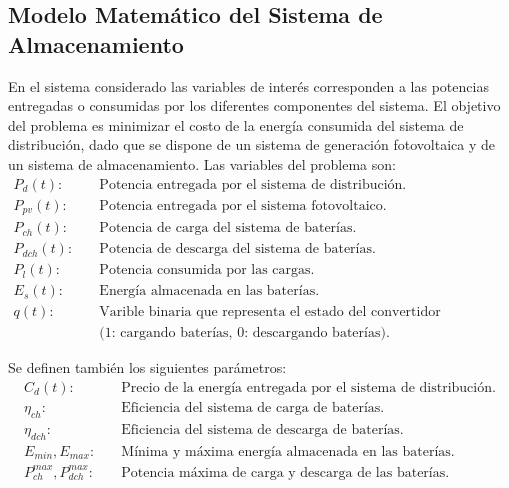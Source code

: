 \subsection{Modelo Matemático del Sistema de Almacenamiento}\label{sec:modeloSistema}
En el sistema considerado las variables de interés corresponden a las potencias entregadas o consumidas por los diferentes componentes del sistema. El objetivo del problema es minimizar el costo de la energía consumida del sistema de distribución, dado que se dispone de un sistema de generación fotovoltaica y de un sistema de almacenamiento. Las variables del problema son:
\begin{align*}
	P_d(t): \quad & \text{Potencia entregada por el sistema de distribución.}\\
	P_{pv}(t): \quad & \text{Potencia entregada por el sistema fotovoltaico.}\\
	P_{ch}(t): \quad & \text{Potencia de carga del sistema de baterías.}\\
	P_{dch}(t): \quad & \text{Potencia de descarga del sistema de baterías.}\\
	P_l(t): \quad & \text{Potencia consumida por las cargas.}\\
	E_s(t): \quad & \text{Energía almacenada en las baterías.}\\
	q(t): \quad & \text{Varible binaria que representa el estado del convertidor bidireccional}\\
	& \text{(1: cargando baterías, 0: descargando baterías).}
\end{align*}

Se definen también los siguientes parámetros:
\begin{align*}
	C_d(t): \quad & \text{Precio de la energía entregada por el sistema de distribución.}\\
	\eta_{ch}: \quad & \text{Eficiencia del sistema de carga de baterías.}\\
	\eta_{dch}: \quad & \text{Eficiencia del sistema de descarga de baterías.}\\
	E_{min}, E_{max}: \quad & \text{Mínima y máxima energía almacenada en las baterías.}\\
	P_{ch}^{max}, P_{dch}^{max}: \quad & \text{Potencia máxima de carga y descarga de las baterías.}
\end{align*}


